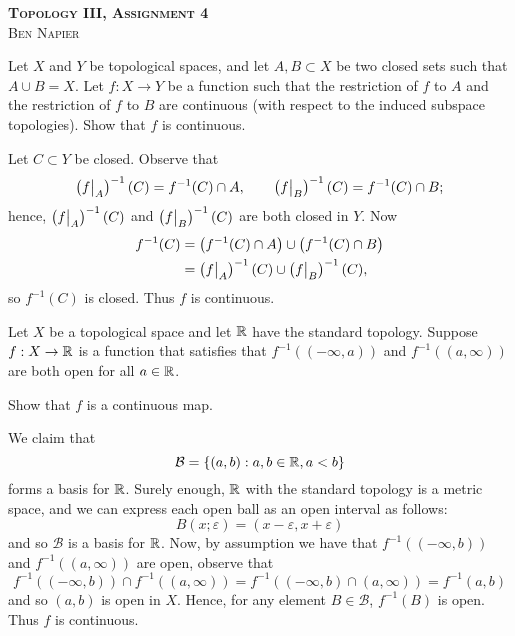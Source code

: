 \documentclass[a4paper, answers]{exam}
\begin{document}
\begin{center}
	\textbf{\textsc{Topology III, Assignment 4}}
	\\
	\textsc{Ben Napier}
	\vspace{1em}
\end{center}
\begin{questions}
	\question Let $X$ and $Y$ be topological spaces, and let $A, B \subset X$ be
	two closed sets such that $A \cup B = X$.
	Let $f: X \to Y$ be a function such that the restriction of $f$ to $A$ and
	the restriction of $f$ to $B$ are continuous (with respect to the induced
	subspace topologies).
	Show that $f$ is continuous.
	\begin{solution}
		Let $C \subset Y$ be closed.
		Observe that
		\[
			\left( \restr fA \right)^{-1}(C) = f^{-1}(C) \cap A, \qquad
			\left( \restr fB \right)^{-1}(C) = f^{-1}(C) \cap B;
		\]
		hence, 
		$\left( \restr fA \right)^{-1}(C)$ 
		and 
		$\left( \restr fB \right)^{-1}(C)$
		are both closed in $Y$.
		Now
		\begin{align*}
			f^{-1}(C)
			&= \left( f^{-1}(C) \cap A \right) \cup 
				\left( f^{-1}(C) \cap B \right) \\
			&= \left( \restr fA \right)^{-1}(C) 
				\cup \left( \restr fB \right)^{-1}(C),
		\end{align*}
		so $f^{-1}(C)$ is closed.
		Thus $f$ is continuous.
	\end{solution}

	\question Let $X$ be a topological space and let $\mathbb{R}$ have the standard
	topology.
	Suppose $f: X \to \mathbb{R}$ is a function that satisfies that $f^{-1}((-\infty,a))$
	and $f^{-1}((a,\infty))$ are both open for all $a \in \mathbb{R}$.

	Show that $f$ is a continuous map.
	\begin{solution}
		We claim that
		\[
			\mathcal B = \left\{ (a,b): a,b \in \mathbb{R}, a < b \right\}
		\]
		forms a basis for $\mathbb{R}$.
		Surely enough, $\mathbb{R}$ with the standard topology is a metric space,
		and we can express each open ball as an open interval as follows:
		\[
			B(x; \varepsilon) = (x - \varepsilon, x + \varepsilon)
		\]
		and so $\mathcal B$ is a basis for $\mathbb{R}$.
		Now, by assumption we have that
		$f^{-1}((-\infty, b))$
		and
		$f^{-1}((a, \infty))$
		are open, observe that
		\[
			f^{-1}((-\infty, b)) \cap f^{-1}((a, \infty))
			= f^{-1}((-\infty, b) \cap (a, \infty))
			= f^{-1}(a,b)
		\]
		and so $(a,b)$ is open in $X$.
		Hence, for any element $B \in \mathcal B$, $f^{-1}(B)$ is open.
		Thus $f$ is continuous.
	\end{solution}


\end{questions}
\end{document}
